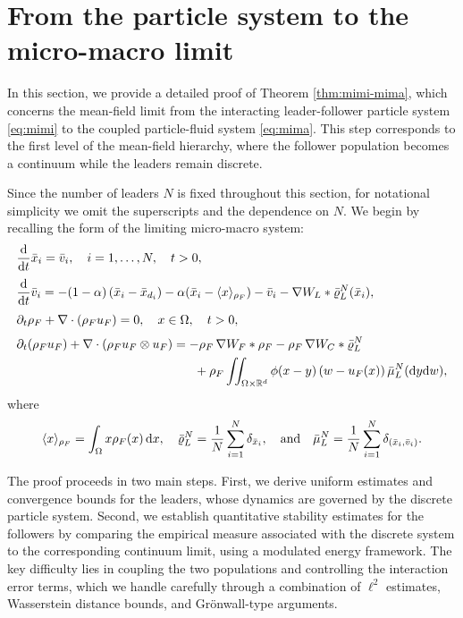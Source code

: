 \documentclass[10pt, reqno]{amsart}
\theoremstyle{definition}
\theoremstyle{remark}
\numberwithin{equation}{section}
\newcommand{\dx}{\textnormal{d}x}
\newcommand{\dy}{\textnormal{d}y}
\newcommand{\dw}{\textnormal{d}w}
\newcommand{\ddt}{\frac{\textnormal{d}}{\textnormal{d}t}}
\newcommand{\R}{\mathbb{R}}
\begin{document}
%
%
%
%
%
%
%
%
%
%
%
%
%
%
\section{From the particle system to the micro-macro limit}\label{sec:mimi-mima}
In this section, we provide a detailed proof of Theorem \ref{thm:mimi-mima}, which concerns the mean-field limit from the interacting leader-follower particle system \eqref{eq:mimi} to the coupled particle-fluid system \eqref{eq:mima}. This step corresponds to the first level of the mean-field hierarchy, where the follower population becomes a continuum while the leaders remain discrete.

Since the number of leaders $N$ is fixed throughout this section, for notational simplicity we omit the superscripts and the dependence on $N$. We begin by recalling the form of the limiting micro-macro system:
\begin{align} \label{eq: micmac lim}
\begin{aligned}
    &\ddt \bar{x}_i = \bar{v}_i, \quad i = 1,\dots, N, \quad t > 0,\\[1mm]
    &\ddt \bar{v}_i = -(1-\alpha)\left(\bar{x}_i - \bar x_{d_i} \right) -\alpha (\bar{x}_i - \langle x \rangle_{\rho_F} ) - \bar{v}_i - \nabla W_L *  \bar\varrho_{L}^N(\bar{x}_i),\\[1mm]
    &\partial_t \rho_F + \nabla \cdot (\rho_F u_F) = 0, \quad x\in \Omega, \quad t > 0,\\[1mm]
    &\partial_t (\rho_F u_F) + \nabla \cdot (\rho_F u_F\otimes u_F) = -\rho_F\, \nabla W_F * \rho_F - \rho_F\, \nabla W_C *   \bar\varrho_{L}^N \\
    &\hspace{5cm} + \rho_F \iint_{\Omega\times\R^d} \phi(x-y)\,(w - u_F(x))\,\bar\mu_L^N(\dy\dw),
\end{aligned}
\end{align}
where
\[
\langle x \rangle_{\rho_F} = \int_{\Omega} x\rho_F(x)\,\dx, \quad \bar\varrho_{L}^N = \frac1N \sum_{i=1}^N \delta_{\bar x_i},  \quad \mbox{and}  \quad \bar\mu_L^N = \frac1N \sum_{i=1}^N \delta_{(\bar x_i, \bar v_i)}.
\]

The proof proceeds in two main steps. First, we derive uniform estimates and convergence bounds for the leaders, whose dynamics are governed by the discrete particle system. Second, we establish quantitative stability estimates for the followers by comparing the empirical measure associated with the discrete system to the corresponding continuum limit, using a modulated energy framework. The key difficulty lies in coupling the two populations and controlling the interaction error terms, which we handle carefully through a combination of $\ell^2$ estimates, Wasserstein distance bounds, and Gr\"onwall-type arguments.
\end{document}
